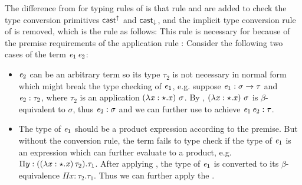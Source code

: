 The difference from \cc for typing rules of \expcc is that rule  and  are added to check the type conversion primitives $ \mathsf{cast}^{\uparrow} $ and $ \mathsf{cast}_{\downarrow} $, and the implicit type conversion rule of \cc is removed, which is the rule as follows:
\ottusedrule{\ottdruleTXXConv{}}
This rule is necessary for \cc because of the premise requirements of the application rule :
\ottusedrule{\ottdruleTXXApp{}}
Consider the following two cases of the term $\mathit{e_{{\mathrm{1}}}} \, \mathit{e_{{\mathrm{2}}}}$:
\begin{itemize}
\item $\mathit{e_{{\mathrm{2}}}}$ can be an arbitrary term so its type $\tau_{{\mathrm{2}}}$ is not necessary in normal form which might break the type checking of $\mathit{e_{{\mathrm{1}}}}$, e.g. suppose $\mathit{e_{{\mathrm{1}}}}:\sigma  \rightarrow  \tau$ and $\mathit{e_{{\mathrm{2}}}} : \tau_{{\mathrm{2}}}$, where $\tau_{{\mathrm{2}}}$ is an application $(\lambda  \mathit{x}  :  \star  .  \mathit{x})~\sigma$. By , $(\lambda  \mathit{x}  :  \star  .  \mathit{x})~\sigma$ is $\beta$-equivalent to $\sigma$, thus $\mathit{e_{{\mathrm{2}}}} : \sigma$ and we can further use  to achieve $\mathit{e_{{\mathrm{1}}}} \, \mathit{e_{{\mathrm{2}}}} : \tau$.
\item The type of $\mathit{e_{{\mathrm{1}}}}$ should be a product expression according to the premise. But without the conversion rule, the term fails to type check if the type of $\mathit{e_{{\mathrm{1}}}}$ is an expression which can further evaluate to a product, e.g. $ \Pi  y:((  \lambda  \mathit{x}  :  \star  .  \mathit{x}  ) \, \tau_{{\mathrm{2}}}).\tau_{{\mathrm{1}}}$. After applying , the type of $\mathit{e_{{\mathrm{1}}}}$ is converted to its $\beta$-equivalence $ \Pi  x:\tau_{{\mathrm{2}}}.\tau_{{\mathrm{1}}}$. Thus we can further apply the .
\end{itemize}

